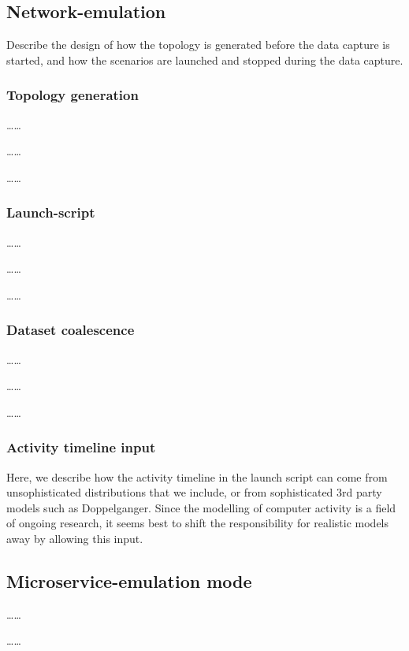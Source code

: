 \documentclass[sigconf]{acmart}
\begin{document}


\subsection{Network-emulation}

Describe the design of how the topology is generated before the data capture is started, and how the scenarios are launched and stopped during the data capture.
\subsubsection{Topology generation}
\dots \dots

\dots \dots

\dots \dots
\subsubsection{Launch-script}

\dots \dots

\dots \dots

\dots \dots

\subsubsection{Dataset coalescence}\label{Sec:datasetcreation}
\dots \dots

\dots \dots

\dots \dots
\subsubsection{Activity timeline input}
Here, we describe how the activity timeline in the launch script can come from unsophisticated distributions that we include, or from sophisticated 3rd party models such as Doppelganger. Since the modelling of computer activity is a field of ongoing research, it seems best to shift the responsibility for realistic models away by allowing this input. 

\subsection{Microservice-emulation mode}

\dots \dots

\dots \dots
\end{document}
